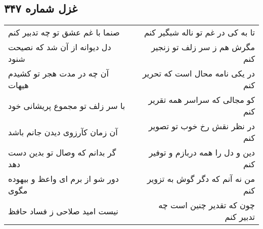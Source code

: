 \begin{center}
\section*{غزل شماره ۳۴۷}
\label{sec:sh347}
\begin{longtable}{l p{0.5cm} r}
صنما با غم عشق تو چه تدبیر کنم
&&
تا به کی در غم تو ناله شبگیر کنم
\\
دل دیوانه از آن شد که نصیحت شنود
&&
مگرش هم ز سر زلف تو زنجیر کنم
\\
آن چه در مدت هجر تو کشیدم هیهات
&&
در یکی نامه محال است که تحریر کنم
\\
با سر زلف تو مجموع پریشانی خود
&&
کو مجالی که سراسر همه تقریر کنم
\\
آن زمان کآرزوی دیدن جانم باشد
&&
در نظر نقش رخ خوب تو تصویر کنم
\\
گر بدانم که وصال تو بدین دست دهد
&&
دین و دل را همه دربازم و توفیر کنم
\\
دور شو از برم ای واعظ و بیهوده مگوی
&&
من نه آنم که دگر گوش به تزویر کنم
\\
نیست امید صلاحی ز فساد حافظ
&&
چون که تقدیر چنین است چه تدبیر کنم
\\
\end{longtable}
\end{center}
